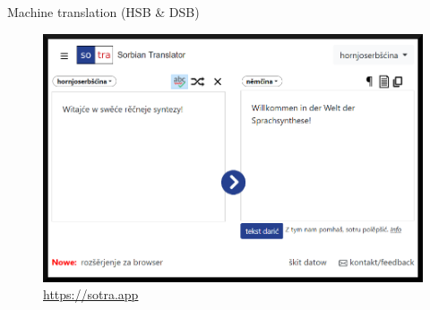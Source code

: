   \begin{block}{Machine translation (HSB \& DSB)}


    \begin{figure}
        \centering
        \includegraphics[width=0.7\colwidth]{02_z_01_sotra_rand.png}
        \caption{\url{https://sotra.app}}
        \label{fig:webcaptioner}
    \end{figure}


  \end{block}
